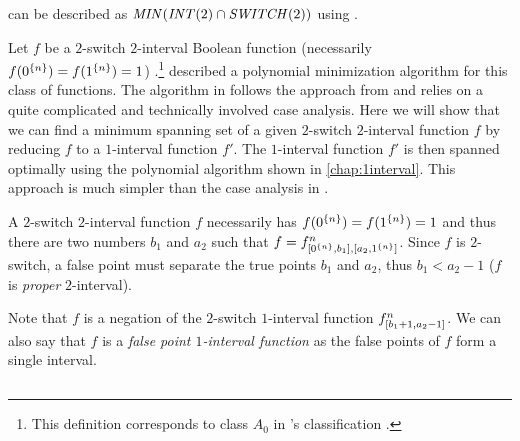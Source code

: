 can be described as
$\mathit{MIN} (\mathit{INT} (2) \cap \mathit{SWITCH} (2))$
using
.

Let $f$ be a $2$-switch $2$-interval Boolean function
(necessarily $f(0^{\{n\}}) = f(1^{\{n\}})
= 1$)
.\footnote{This definition corresponds to class $A_0$
in \citeauthor{Dubovsky2012}'s classification
\citep[p.~5]{Dubovsky2012}.}
\citeauthor{Dubovsky2012} described a polynomial minimization algorithm for this class of functions.
The algorithm in \citet[p.~17]{Dubovsky2012}
follows the approach from \citet{Schieber2005154}
and relies on a quite complicated and technically involved case analysis.
Here we will show that we can find a minimum spanning set of a given $2$-switch $2$-interval function $f$ by reducing $f$ to a $1$-interval function $f'$.
The $1$-interval function $f'$ is then spanned optimally
using the polynomial algorithm
shown in \cref{chap:1interval}.
This approach is much simpler
than the case analysis in \citet{Dubovsky2012}.

A $2$-switch $2$-interval function $f$ necessarily has $f(0^{\{n\}})=f(1^{\{n\}})=1$
and thus there are two numbers $b_1$ and $a_2$
such that $f = f^{n}_{[0^{\{n\}}, b_1], [a_2, 1^{\{n\}}]}$.
Since $f$ is $2$-switch,
a false point must separate the true points $b_1$ and $a_2$,
thus $b_1 < a_2-1$
($f$ is \emph{proper} $2$-interval).

Note that $f$ is a negation
of the $2$-switch $1$-interval
function $f^n_{[b_1 + 1, a_2 - 1]}$.
We can also say that $f$ is a \emph{false point $1$-interval function}
as the false points of $f$ form a single interval.

\subsection{\algdesctitle}

